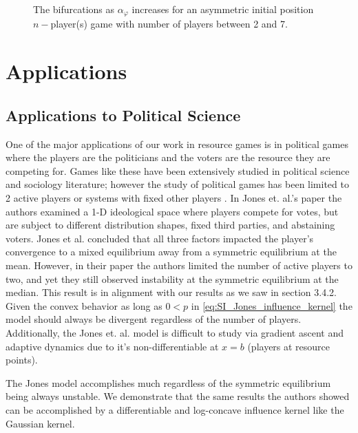 \documentclass{article}
\begin{document}
\begin{figure}[ht!]
            \begin{subfigure}[b]{0.75\linewidth}
                \centering
                
                \label{fig8:colorbar}
            \end{subfigure}
            
            \caption{The bifurcations as $\alpha_{\varphi}$  increases for an asymmetric initial position $n-$player(s) game with number of players between 2 and 7.}
            \label{fig8} 
        \end{figure}

        
        \clearpage
     
    \section{Applications}
        \subsection{Applications to Political Science}
        One of the major applications of our work in resource games is in political games where the players are the politicians and the voters are the resource they are competing for. Games like these have been extensively studied in political science and sociology literature; however the study of political games has been limited to 2 active players or systems with fixed other players \cite{jones2022polarization}. In Jones et. al.'s paper the authors examined a 1-D ideological space where players compete for votes, but are subject to different distribution shapes, fixed third parties, and abstaining voters. Jones et al. concluded that all three factors impacted the player's convergence to a mixed equilibrium away from a symmetric  equilibrium at the mean. However, in their paper the authors limited the number of active players to two, and yet they still observed instability at the symmetric equilibrium at the median. This result is in alignment with our results as we saw in section 3.4.2. Given the convex behavior as long as $0<p$ in \cref{eq:SI_Jones_influence_kernel} the model should always be divergent regardless of the number of players. Additionally, the Jones et. al. model is difficult to study via gradient ascent and adaptive dynamics due to it's non-differentiable at $x=b$ (players at resource points). 

        The Jones model accomplishes much regardless of the symmetric equilibrium being always unstable. We demonstrate that the same results the authors showed can be accomplished by a differentiable and log-concave influence kernel like the Gaussian kernel.  
        
\end{document}
